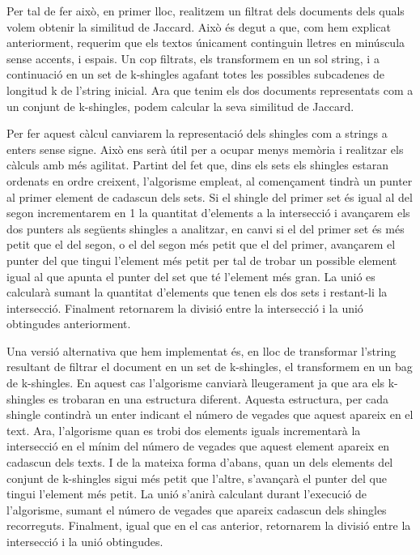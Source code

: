 \documentclass[a4paper, titlepage, 12pt]{report}
\begin{document}
Per tal de fer això, en primer lloc, realitzem un filtrat dels documents dels quals volem obtenir la similitud de Jaccard. Això és degut a que, com hem explicat anteriorment, requerim que els textos únicament continguin lletres en minúscula sense accents, i espais.
Un cop filtrats, els transformem en un sol string, i a continuació en un set de k-shingles agafant totes les possibles subcadenes de longitud k de l’string inicial.
Ara que tenim els dos documents representats com a un conjunt de k-shingles, podem calcular la seva similitud de Jaccard.


Per fer aquest càlcul canviarem la representació dels shingles com a strings a enters sense signe. Això ens serà útil per a ocupar menys memòria i realitzar els càlculs amb més agilitat.
Partint del fet que, dins els sets els shingles estaran ordenats en ordre creixent, l’algorisme empleat, al començament tindrà un punter al primer element de cadascun dels sets. Si el shingle del primer set és igual al del segon incrementarem en 1 la quantitat d’elements a la intersecció i avançarem els dos punters als següents shingles a analitzar, en canvi si el del primer set és més petit que el del segon, o el del segon més petit que el del primer, avançarem el punter del que tingui l’element més petit per tal de trobar un possible element igual al que apunta el punter del set que té l’element més gran.
La unió es calcularà sumant la quantitat d’elements que tenen els dos sets i restant-li la intersecció.
Finalment retornarem la divisió entre la intersecció i la unió obtingudes anteriorment.


Una versió alternativa que hem implementat és, en lloc de transformar l’string resultant de filtrar el document en un set de k-shingles, el transformem en un bag de k-shingles.
En aquest cas l’algorisme canviarà lleugerament ja que ara els k-shingles es trobaran en una estructura diferent. Aquesta estructura, per cada shingle contindrà un enter indicant el número de vegades que aquest apareix en el text.
Ara, l’algorisme quan es trobi dos elements iguals incrementarà la intersecció en el mínim del número de vegades que aquest element apareix en cadascun dels texts. I de la mateixa forma d’abans, quan un dels elements del conjunt de k-shingles sigui més petit que l’altre, s’avançarà el punter del que tingui l’element més petit.
La unió s’anirà calculant durant l’execució de l’algorisme, sumant el número de vegades que apareix cadascun dels shingles recorreguts.
Finalment, igual que en el cas anterior, retornarem la divisió entre la intersecció i la unió obtingudes.
\end{document}
